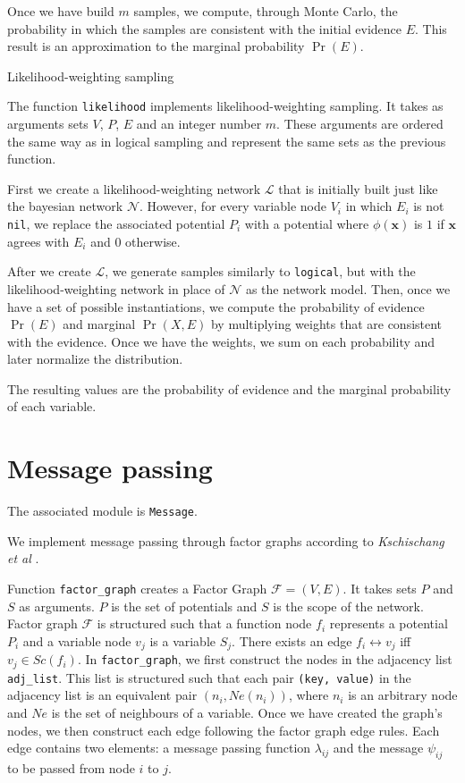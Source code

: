 \documentclass{amsart}
\makeatletter
\def\subsection{\@startsection{subsection}{3}%
  \z@{.5\linespacing\@plus.7\linespacing}{.1\linespacing}%
  {\normalfont\itshape}}
\theoremstyle{plain}
\newcommand{\code}[1]{\lstinline[mathescape=true]{#1}}
\makeatother
\begin{document}
Once we have build $m$ samples, we compute, through Monte Carlo, the probability in which the
samples are consistent with the initial evidence $E$. This result is an approximation to the
marginal probability $\Pr(E)$.

\subsection{Likelihood-weighting sampling}

The function \code{likelihood} implements likelihood-weighting sampling. It takes as arguments
sets $V$, $P$, $E$ and an integer number $m$. These arguments are ordered the same way as in
logical sampling and represent the same sets as the previous function.

First we create a likelihood-weighting network $\mathcal{L}$ that is initially built just like
the bayesian network $\mathcal{N}$. However, for every variable node $V_i$ in which $E_i$ is
not \code{nil}, we replace the associated potential $P_i$ with a potential where $\phi(\mathbf{x})$
is $1$ if $\mathbf{x}$ agrees with $E_i$ and $0$ otherwise.

After we create $\mathcal{L}$, we generate samples similarly to \code{logical}, but with the
likelihood-weighting network in place of $\mathcal{N}$ as the network model. Then, once we have
a set of possible instantiations, we compute the probability of evidence $\Pr(E)$ and marginal
$\Pr(X, E)$ by multiplying weights that are consistent with the evidence. Once we have the weights,
we sum on each probability and later normalize the distribution.

The resulting values are the probability of evidence and the marginal probability of each variable.

\section{Message passing}

The associated module is \code{Message}.

We implement message passing through factor graphs according to \textit{Kschischang et al}
\cite{factor-graphs-sp}.

Function \code{factor_graph} creates a Factor Graph $\mathcal{F}=(V,E)$. It takes sets $P$ and $S$
as arguments. $P$ is the set of potentials and $S$ is the scope of the network. Factor graph
$\mathcal{F}$ is structured such that a function node $f_i$ represents a potential $P_i$ and a
variable node $v_j$ is a variable $S_j$. There exists an edge $f_i\leftrightarrow v_j$ iff $v_j\in
Sc(f_i)$. In \code{factor_graph}, we first construct the nodes in the adjacency list
\code{adj_list}. This list is structured such that each pair \code{(key, value)} in the adjacency
list is an equivalent pair $(n_i, Ne(n_i))$, where $n_i$ is an arbitrary node and $Ne$ is the set
of neighbours of a variable. Once we have created the graph's nodes, we then construct each edge
following the factor graph edge rules. Each edge contains two elements: a message passing function
$\lambda_{ij}$ and the message $\psi_{ij}$ to be passed from node $i$ to $j$.
\end{document}
